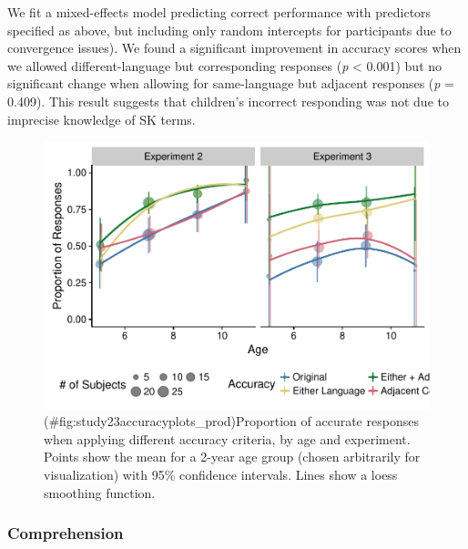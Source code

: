 \documentclass[,man,floatsintext]{apa6}
\theoremstyle{definition}
\theoremstyle{definition}
\theoremstyle{definition}
\theoremstyle{remark}
\begin{document}
We fit a mixed-effects model predicting correct performance with
predictors specified as above, but including only random intercepts for
participants due to convergence issues). We found a significant
improvement in accuracy scores when we allowed different-language but
corresponding responses (\emph{p} \textless{} 0.001) but no significant
change when allowing for same-language but adjacent responses (\emph{p}
= 0.409). This result suggests that children's incorrect responding was
not due to imprecise knowledge of SK terms.

\begin{figure}
\centering
\includegraphics{amazon_color_files/figure-latex/study23accuracyplots_prod-1.pdf}
\caption{(\#fig:study23accuracyplots\_prod)Proportion of accurate
responses when applying different accuracy criteria, by age and
experiment. Points show the mean for a 2-year age group (chosen
arbitrarily for visualization) with 95\% confidence intervals. Lines
show a loess smoothing function.}
\end{figure}

\subsubsection{Comprehension}\label{comprehension}
\end{document}
